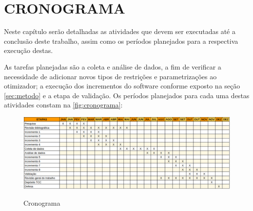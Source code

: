 
\chapter{CRONOGRAMA}
\label{chap:cronograma}
Neste capítulo serão detalhadas as atividades que devem ser executadas até a conclusão deste trabalho, assim como os períodos planejados para a respectiva execução destas.

As tarefas planejadas são a coleta e análise de dados, a fim de verificar a necessidade de adicionar novos tipos de restrições e parametrizações ao otimizador; a execução dos incrementos do software conforme exposto na seção \ref{sec:metodo} e a etapa de validação. Os períodos planejados para cada uma destas atividades constam na \autoref{fig:cronograma}:

\begin{figure}[!htb]
	\centering
	\caption{Cronograma}
	\includegraphics[width=1\textwidth]{./dados/figuras/cronograma}
	\label{fig:cronograma}
\end{figure}
